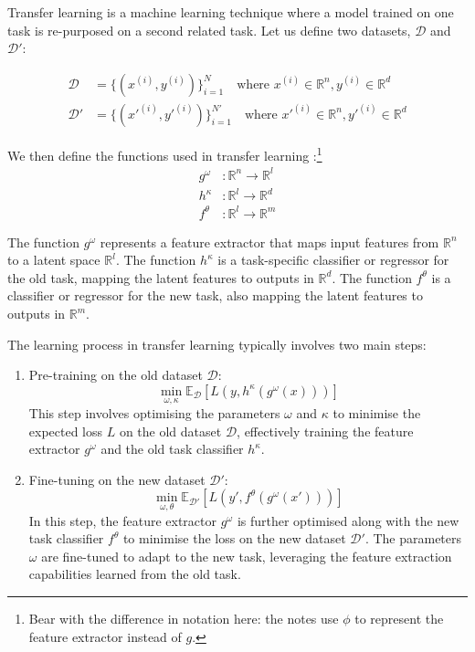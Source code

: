 Transfer learning is a machine learning technique where a model trained on one task is re-purposed on a second related task. Let us define two datasets, $\mathcal{D}$ and $\mathcal{D}'$:

\begin{align}
    \mathcal{D}  & = \{(x^{(i)}, y^{(i)})\}_{i=1}^N \quad \text{where } x^{(i)} \in \mathbb{R}^n, y^{(i)} \in \mathbb{R}^d        \\
    \mathcal{D}' & = \{(x'^{(i)}, y'^{(i)})\}_{i=1}^{N'} \quad \text{where } x'^{(i)} \in \mathbb{R}^n, y'^{(i)} \in \mathbb{R}^d
\end{align}

We then define the functions used in transfer learning :\footnote[][]{Bear with the difference in notation here: the notes use $\phi$ to represent the feature extractor instead of $g$.}
\begin{align}
    g^\omega & : \mathbb{R}^n \rightarrow \mathbb{R}^l \\
    h^\kappa & : \mathbb{R}^l \rightarrow \mathbb{R}^d \\
    f^\theta & : \mathbb{R}^l \rightarrow \mathbb{R}^m
\end{align}

The function $g^\omega$ represents a feature extractor that maps input features from $\mathbb{R}^n$ to a latent space $\mathbb{R}^l$. The function $h^\kappa$ is a task-specific classifier or regressor for the old task, mapping the latent features to outputs in $\mathbb{R}^d$. The function $f^\theta$ is a classifier or regressor for the new task, also mapping the latent features to outputs in $\mathbb{R}^m$. \bigskip

The learning process in transfer learning typically involves two main steps:

\begin{enumerate}
    \item Pre-training on the old dataset $\mathcal{D}$:
          \begin{equation}
              \min_{\omega, \kappa} \mathbb{E}_{\mathcal{D}}[L(y, h^\kappa(g^\omega(x)))]
          \end{equation}
          This step involves optimising the parameters $\omega$ and $\kappa$ to minimise the expected loss $L$ on the old dataset $\mathcal{D}$, effectively training the feature extractor $g^\omega$ and the old task classifier $h^\kappa$.

    \item Fine-tuning on the new dataset $\mathcal{D}'$:
          \begin{equation}
              \min_{\omega, \theta} \mathbb{E}_{\mathcal{D}'}[L(y', f^\theta(g^\omega(x')))]
          \end{equation}
          In this step, the feature extractor $g^\omega$ is further optimised along with the new task classifier $f^\theta$ to minimise the loss on the new dataset $\mathcal{D}'$. The parameters $\omega$ are fine-tuned to adapt to the new task, leveraging the feature extraction capabilities learned from the old task.

\end{enumerate}

